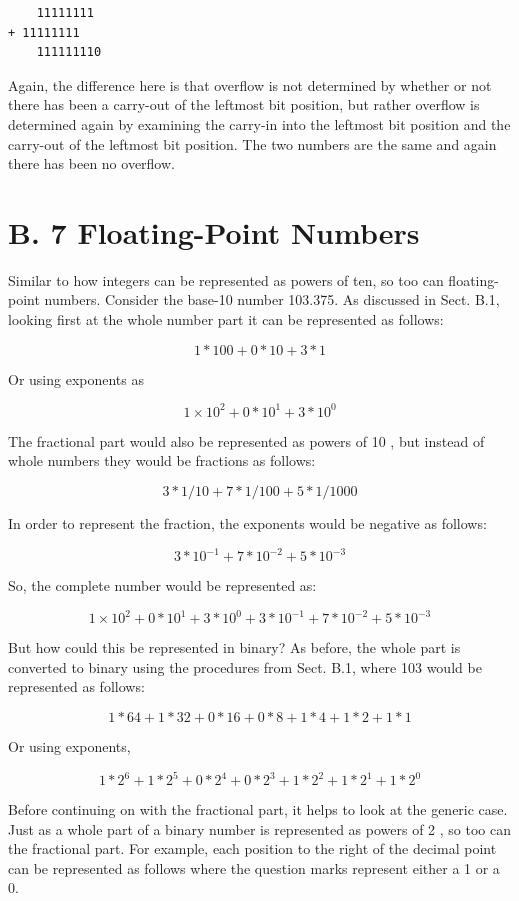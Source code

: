 \documentclass[10pt]{book}
\begin{document}
\begin{verbatim}
    11111111
+ 11111111
    111111110
\end{verbatim}

Again, the difference here is that overflow is not determined by whether or not there has been a carry-out of the leftmost bit position, but rather overflow is determined again by examining the carry-in into the leftmost bit position and the carry-out of the leftmost bit position. The two numbers are the same and again there has been no overflow.

\section{B. 7 Floating-Point Numbers}
Similar to how integers can be represented as powers of ten, so too can floating-point numbers. Consider the base-10 number 103.375. As discussed in Sect. B.1, looking first at the whole number part it can be represented as follows:

$$
1 * 100+0 * 10+3 * 1
$$

Or using exponents as

$$
1 \times 10^{2}+0 * 10^{1}+3 * 10^{0}
$$

The fractional part would also be represented as powers of 10 , but instead of whole numbers they would be fractions as follows:

$$
3 * 1 / 10+7 * 1 / 100+5 * 1 / 1000
$$

In order to represent the fraction, the exponents would be negative as follows:

$$
3 * 10^{-1}+7 * 10^{-2}+5 * 10^{-3}
$$

So, the complete number would be represented as:

$$
1 \times 10^{2}+0 * 10^{1}+3 * 10^{0}+3 * 10^{-1}+7 * 10^{-2}+5 * 10^{-3}
$$

But how could this be represented in binary? As before, the whole part is converted to binary using the procedures from Sect. B.1, where 103 would be represented as follows:

$$
1 * 64+1 * 32+0 * 16+0 * 8+1 * 4+1 * 2+1 * 1
$$

Or using exponents,

$$
1 * 2^{6}+1 * 2^{5}+0 * 2^{4}+0 * 2^{3}+1 * 2^{2}+1 * 2^{1}+1 * 2^{0}
$$

Before continuing on with the fractional part, it helps to look at the generic case. Just as a whole part of a binary number is represented as powers of 2 , so too can the fractional part. For example, each position to the right of the decimal point can be represented as follows where the question marks represent either a 1 or a 0.
\end{document}
